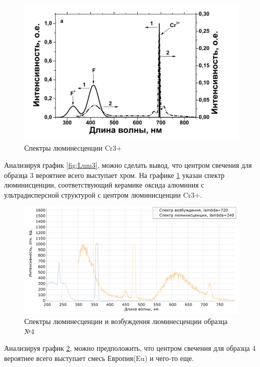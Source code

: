 \begin{figure}[H]
	\centering
	\includegraphics[width=5in]{figures/img_2}
	\caption{Спектры люминесценции Cr3+\cite{CShtang}}
	\label{fig:LumCr}
\end{figure}

Анализируя график \ref{fig:Lum3}, можно сделать вывод, что
центром свечения для образца 3 вероятнее всего выступает хром.
На графике \ref{fig:LumCr} указан спектр люминисценции, соответствующий керамике оксида алюминия с ультрадисперсной структурой с центром люминисценции Cr3+.

\begin{figure}[H]
	\centering
	\includegraphics[width=7in]{figures/Obr_4}
	\caption{Спектры люминесценции и возбуждения люминесценции образца №4}
	\label{fig:Lum4}
\end{figure}

Анализируя график \ref{fig:Lum4}, можно предположить, что
центром свечения для образца 4 вероятнее всего выступает смесь Европия(Eu) и чего-то еще.

